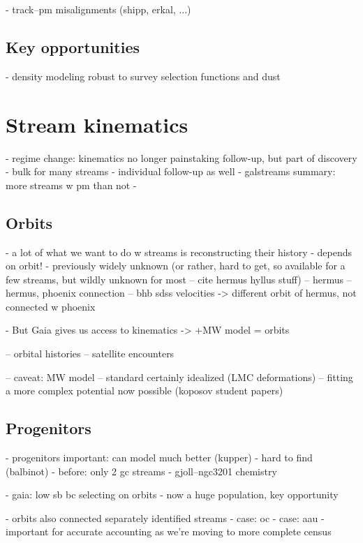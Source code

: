 \documentclass[final,5p,times,twocolumn,authoryear]{elsarticle}
\begin{document}
- track--pm misalignments (shipp, erkal, ...)

\subsection{Key opportunities}
- density modeling robust to survey selection functions and dust



\section{Stream kinematics}
\label{sec:orbits}
- regime change: kinematics no longer painstaking follow-up, but part of discovery
- bulk for many streams \citep{streamfinders}
- individual follow-up as well \citep{others}
- galstreams summary: more streams w pm than not
-

\subsection{Orbits}
- a lot of what we want to do w streams is reconstructing their history
- depends on orbit!
- previously widely unknown (or rather, hard to get, so available for a few streams, but wildly unknown for most -- cite hermus hyllus stuff)
-- hermus \citep{grillmair:2014}
-- hermus, phoenix connection \citep{gc:2016}
-- bhb sdss velocities -> different orbit of hermus, not connected w phoenix \citep{martin:2018}

- But Gaia gives us access to kinematics -> +MW model = orbits

-- orbital histories
-- satellite encounters

-- caveat: MW model
-- standard certainly idealized (LMC deformations)
-- fitting a more complex potential now possible (koposov student papers)


\subsection{Progenitors}
- progenitors important: can model much better (kupper)
- hard to find (balbinot)
- before: only 2 gc streams
- gjoll--ngc3201 chemistry \citep{hansen:2020}

- gaia: low sb bc selecting on orbits
- now a huge population, key opportunity

- orbits also connected separately identified streams
- case: oc
- case: aau \citep{li:2021}
- important for accurate accounting as we're moving to more complete census
\end{document}
